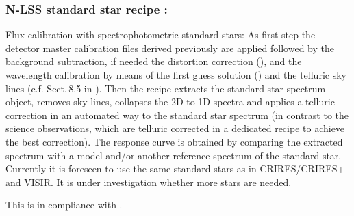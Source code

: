 \clearpage

\subsubsection{N-LSS standard star recipe :}\label{rec:metis_n_lss_std}
Flux calibration with spectrophotometric standard stars: As first step the detector master calibration files derived previously are applied followed by the background subtraction, if needed the distortion correction (), and
the wavelength calibration by means of the first guess solution () and the telluric sky lines (c.f. Sect.\,8.5 in \cite{DRLS}).
 Then the recipe extracts the standard star spectrum object, removes sky lines, collapses the 2D to 1D spectra and applies a telluric correction in an automated way to the standard star spectrum (in contrast to the science observations, which are telluric corrected in a dedicated recipe to achieve the best correction). The response curve is obtained by comparing the extracted spectrum with a model and/or another reference spectrum of the standard star. Currently it is foreseen to use the same standard stars as in \ac{CRIRES}/CRIRES+ and \ac{VISIR}. It is under investigation whether more stars are needed.

 This is in compliance with .

